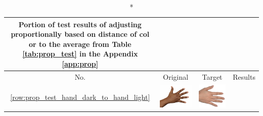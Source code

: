 \begin{longtable}{|c||c|c|c|}
    \caption*{Portion of test results of adjusting proportionally based on distance of col or to the average from Table \ref{tab:prop_test} in the Appendix \ref{app:prop}}\\
    \hline
    No. & Original & Target & Results \\
    \hline  \ref{row:prop_test_hand_dark_to_hand_light} &
  \begin{minipage}{.29\textwidth}
    \includegraphics[width=\textwidth,height=\textheight,keepaspectratio]{../inputs/hand_dark.jpg}
  \end{minipage} & 
  \begin{minipage}{.29\textwidth}
    \includegraphics[width=\textwidth,height=\textheight,keepaspectratio]{../inputs/hand_light.jpg}

\end{minipage}
\end{longtable}
